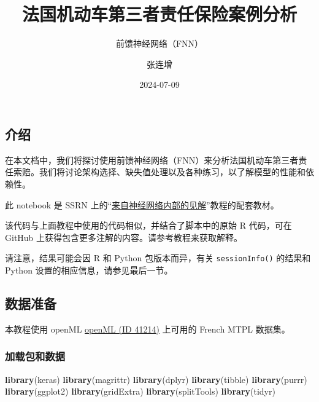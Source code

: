 \documentclass[
]{article}
\title{法国机动车第三者责任保险案例分析}
\subtitle{前馈神经网络（FNN）}
\author{张连增}
\date{2024-07-09}
\newenvironment{Shaded}{\begin{snugshade}}{\end{snugshade}}
\newcommand{\AttributeTok}[1]{\textcolor[rgb]{0.13,0.29,0.53}{#1}}
\newcommand{\CommentTok}[1]{\textcolor[rgb]{0.56,0.35,0.01}{\textit{#1}}}
\newcommand{\DecValTok}[1]{\textcolor[rgb]{0.00,0.00,0.81}{#1}}
\newcommand{\FunctionTok}[1]{\textcolor[rgb]{0.13,0.29,0.53}{\textbf{#1}}}
\newcommand{\NormalTok}[1]{#1}
\newcommand{\SpecialCharTok}[1]{\textcolor[rgb]{0.81,0.36,0.00}{\textbf{#1}}}
\begin{document}
\maketitle

{
\setcounter{tocdepth}{2}
\tableofcontents
}
\subsection{介绍}\label{ux4ecbux7ecd}

在本文档中，我们将探讨使用前馈神经网络（FNN）来分析法国机动车第三者责任索赔。我们将讨论架构选择、缺失值处理以及各种练习，以了解模型的性能和依赖性。

此 notebook 是 SSRN
上的``\href{https://www.ssrn.com/}{来自神经网络内部的见解}''教程的配套教材。

该代码与上面教程中使用的代码相似，并结合了脚本中的原始 R 代码，可在
GitHub 上获得包含更多注解的内容。请参考教程来获取解释。

请注意，结果可能会因 R 和 Python 包版本而异，有关 \texttt{sessionInfo()}
的结果和 Python 设置的相应信息，请参见最后一节。

\subsection{数据准备}\label{ux6570ux636eux51c6ux5907}

本教程使用 openML \href{https://www.openml.org/d/41214}{openML (ID
41214)} 上可用的 French MTPL 数据集。

\subsubsection{加载包和数据}\label{ux52a0ux8f7dux5305ux548cux6570ux636e}

\begin{Shaded}
\begin{Highlighting}[]
\FunctionTok{library}\NormalTok{(keras)}
\FunctionTok{library}\NormalTok{(magrittr)}
\FunctionTok{library}\NormalTok{(dplyr)}
\FunctionTok{library}\NormalTok{(tibble)}
\FunctionTok{library}\NormalTok{(purrr)}
\FunctionTok{library}\NormalTok{(ggplot2)}
\FunctionTok{library}\NormalTok{(gridExtra)}
\FunctionTok{library}\NormalTok{(splitTools)}
\FunctionTok{library}\NormalTok{(tidyr)}
\end{Highlighting}
\end{Shaded}

\begin{Shaded}
\end{Shaded}
\end{document}
